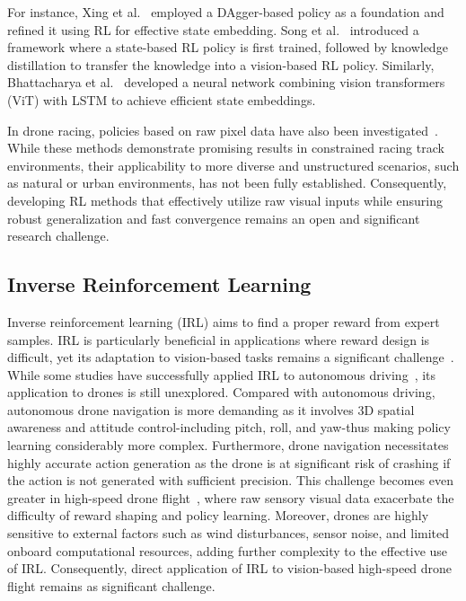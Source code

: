 For instance, Xing et al.~\cite{xing2024bootstrapping} employed a DAgger-based policy as a foundation and refined it using RL for effective state embedding. Song et al.~\cite{song2023learning} introduced a framework where a state-based RL policy is first trained, followed by knowledge distillation to transfer the knowledge into a vision-based RL policy. Similarly, Bhattacharya et al.~\cite{bhattacharya2024vision} developed a neural network combining vision transformers (ViT) with LSTM to achieve efficient state embeddings.

In drone racing, policies based on raw pixel data have also been investigated~\cite{song2023reaching, geles2024demonstrating}. While these methods demonstrate promising results in constrained racing track environments, their applicability to more diverse and unstructured scenarios, such as natural or urban environments, has not been fully established. Consequently, developing RL methods that effectively utilize raw visual inputs while ensuring robust generalization and fast convergence remains an open and significant research challenge.

\subsection{Inverse Reinforcement Learning}
Inverse reinforcement learning (IRL) aims to find a proper reward from expert samples. IRL is particularly beneficial in applications where reward design is difficult, yet its adaptation to vision-based tasks remains a significant challenge~\cite{ho2016generative}. While some studies have successfully applied IRL to autonomous driving~\cite{lee2021approximate, liu2022improved}, its application to drones is still unexplored. Compared with autonomous driving, autonomous drone navigation is more demanding as it involves 3D spatial awareness and attitude control-including pitch, roll, and yaw-thus making policy learning considerably more complex. Furthermore, drone navigation necessitates highly accurate action generation as the drone is at significant risk of crashing if the action is not generated with sufficient precision. This challenge becomes even greater in high-speed drone flight~\cite{arora2021survey}, where raw sensory visual data exacerbate the difficulty of reward shaping and policy learning. Moreover, drones are highly sensitive to external factors such as wind disturbances, sensor noise, and limited onboard computational resources, adding further complexity to the effective use of IRL. Consequently, direct application of IRL to vision-based high-speed drone flight remains as significant challenge.